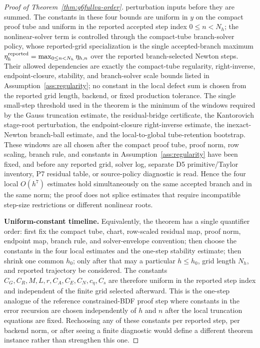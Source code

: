 \documentclass[preprint,12pt]{elsarticle}
\begin{document}
\begin{proof}[Proof of Theorem~\ref{thm:g6fullva-order}]
perturbation inputs before they are summed.
The constants in these four bounds are uniform in \(y\) on the compact proof
tube and uniform in the reported accepted step index \(0\le n<N_h\); the
nonlinear-solver term is controlled through the compact-tube branch-solver
policy, whose reported-grid specialization is the single accepted-branch
maximum \(\eta_h^{\rm reported}=\max_{0\le n<N_h}\eta_{h,n}\) over the reported
branch-selected Newton steps.
Their allowed dependencies are exactly the compact-tube regularity,
right-inverse, endpoint-closure, stability, and branch-solver scale bounds
listed in Assumption~\ref{ass:regularity}; no constant in the local defect
sum is chosen from the reported grid length, backend, or fixed production
tolerance.
The single small-step threshold used in the theorem is the minimum of the
windows required by the Gauss truncation estimate, the residual-bridge
certificate, the Kantorovich stage-root perturbation, the endpoint-closure
right-inverse estimate, the inexact-Newton branch-ball estimate, and the
local-to-global tube-retention bootstrap. These windows are all chosen after
the compact proof tube, proof norm, row scaling, branch rule, and constants in
Assumption~\ref{ass:regularity} have been fixed, and before any reported grid,
solver log, separate D5 primitive/Taylor inventory, P7 residual table, or
source-policy diagnostic is read. Hence the four local \(O(h^7)\) estimates hold
simultaneously on the same accepted branch and in the same norm; the proof
does not splice estimates that require incompatible step-size restrictions or
different nonlinear roots.

\noindent\textbf{Uniform-constant timeline.}
Equivalently, the theorem has a single quantifier order: first fix the
compact tube, chart, row-scaled residual map, proof norm, endpoint map,
branch rule, and solver-envelope convention; then choose the constants in the
four local estimates and the one-step stability estimate; then shrink one
common \(h_0\); only after that may a particular \(h\le h_0\), grid length
\(N_h\), and reported trajectory be considered.  The constants
\(C_G,C_R,M,L,r,C_A,C_E,C_N,c_\eta,C_s\) are therefore uniform in the
reported step index and independent of the finite grid selected afterward.
This is the one-step analogue of the reference constrained-BDF proof step
where constants in the error recursion are chosen independently of \(h\) and
\(n\) after the local truncation equations are fixed.  Rechoosing any of
these constants per reported step, per backend norm, or after seeing a
finite diagnostic would define a different theorem instance rather than
strengthen this one.


\end{proof}
\end{document}
